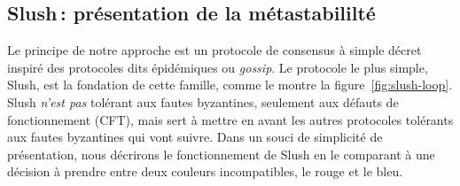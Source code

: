 \documentclass[a4,twocolumn,10pt]{article}
\DeclarePairedDelimiter{\floor}{\lfloor}{\rfloor}
\theoremstyle{definition}
\begin{document}
\subsection{Slush\,: présentation de la métastabililté}


Le principe de notre approche est un protocole de consensus à simple décret inspiré des protocoles dits épidémiques
ou \emph{gossip}. Le protocole le plus simple, Slush, est la fondation de cette famille, comme le montre la
figure~\ref{fig:slush-loop}. Slush \emph{n'est pas} tolérant aux fautes byzantines, seulement aux défauts
de fonctionnement (CFT), mais sert à mettre en avant les autres protocoles tolérants aux fautes byzantines qui vont
suivre. Dans un souci de simplicité de présentation, nous décrirons le fonctionnement de Slush en le comparant
à une décision à prendre entre deux couleurs incompatibles, le rouge et le bleu.

\end{document}
